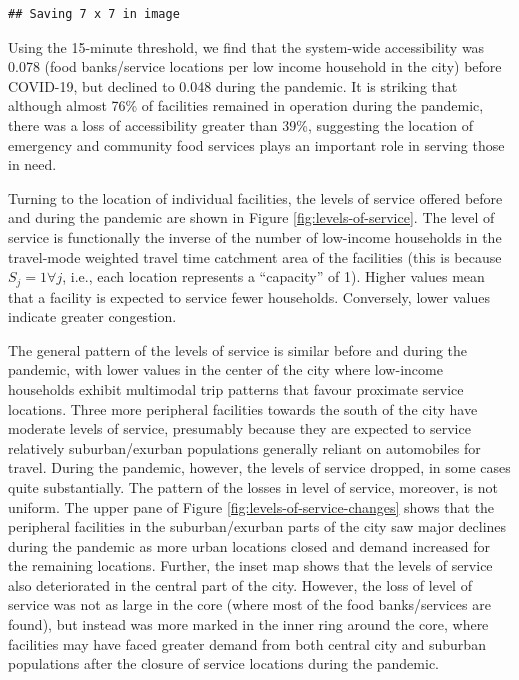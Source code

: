 \documentclass[]{elsarticle} %
\begin{document}
\begin{verbatim}
## Saving 7 x 7 in image
\end{verbatim}

Using the 15-minute threshold, we find that the system-wide
accessibility was 0.078 (food banks/service locations per low income
household in the city) before COVID-19, but declined to 0.048 during the
pandemic. It is striking that although almost 76\% of facilities
remained in operation during the pandemic, there was a loss of
accessibility greater than 39\%, suggesting the location of emergency
and community food services plays an important role in serving those in
need.

Turning to the location of individual facilities, the levels of service
offered before and during the pandemic are shown in Figure
\ref{fig:levels-of-service}. The level of service is functionally the
inverse of the number of low-income households in the travel-mode
weighted travel time catchment area of the facilities (this is because
\(S_j=1 \forall j\), i.e., each location represents a ``capacity'' of
1). Higher values mean that a facility is expected to service fewer
households. Conversely, lower values indicate greater congestion.

The general pattern of the levels of service is similar before and
during the pandemic, with lower values in the center of the city where
low-income households exhibit multimodal trip patterns that favour
proximate service locations. Three more peripheral facilities towards
the south of the city have moderate levels of service, presumably
because they are expected to service relatively suburban/exurban
populations generally reliant on automobiles for travel. During the
pandemic, however, the levels of service dropped, in some cases quite
substantially. The pattern of the losses in level of service, moreover,
is not uniform. The upper pane of Figure
\ref{fig:levels-of-service-changes} shows that the peripheral facilities
in the suburban/exurban parts of the city saw major declines during the
pandemic as more urban locations closed and demand increased for the
remaining locations. Further, the inset map shows that the levels of
service also deteriorated in the central part of the city. However, the
loss of level of service was not as large in the core (where most of the
food banks/services are found), but instead was more marked in the inner
ring around the core, where facilities may have faced greater demand
from both central city and suburban populations after the closure of
service locations during the pandemic.
\end{document}
